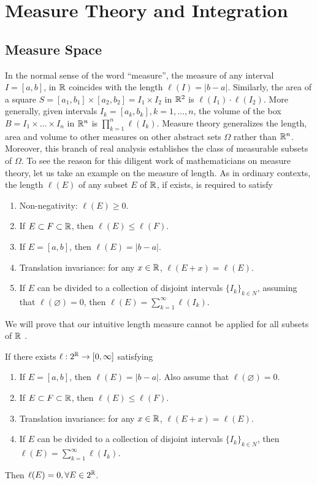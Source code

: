 \section{Measure Theory and Integration}
\subsection{Measure Space}
In the normal sense of the word ``measure'', the measure of any interval $I=[a,b]$, in $\mathbb{R}$ coincides with the length $\ell(I)=|b-a|$. Similarly, the area of a square $S = [a_1,b_1]\times [a_2,b_2] = I_1\times I_2$ in $\mathbb{R}^2$ is $\ell(I_1)\cdot\ell(I_2)$. More generally, given intervals $I_k = [a_k,b_k], k = 1,\ldots, n$, the volume of the box $B= I_1\times \ldots \times I_n$ in  $\mathbb{R}^n$ is $\prod\limits_{k=1}^n \ell(I_k)$. Measure theory generalizes the length, area and volume to other measures on other abstract sets $\Omega$ rather than $\mathbb{R}^n$. Moreover, this branch of real analysis establishes the class of measurable subsets of $\Omega$. To see the reason for this diligent work of mathematicians on measure theory, let us take an example on the measure of length. As in ordinary contexts, the length $\ell(E)$ of any subset $E$ of $\mathbb{R}$, if exists, is required to satisfy

\begin{enumerate}
 \item Non-negativity: $\ell(E) \ge 0$.
 \item If $E\subset F\subset \mathbb{R}$, then $\ell(E)\le \ell(F)$.
 \item If $E=[a,b]$, then $\ell(E) = |b-a|$.
 \item Translation invariance: for any $x\in\mathbb{R}$, $\ell(E+x) = \ell(E)$.
 \item If $E$ can be divided to a collection of disjoint intervals $\{I_k\}_{k\in N}$, assuming that $\ell(\varnothing) = 0$, then $\ell(E) = \sum\limits_{k=1}^\infty \ell(I_k).$
\end{enumerate}

We will prove that our intuitive length measure cannot be applied for all subsets of $\mathbb{R}$ \cite{vitali1905sul}.

\begin{proposition}
 If there exists $\ell : 2^{\mathbb{R}} \to [0,\infty]$ satisfying
 \begin{enumerate}[label=(\arabic*)]
  \item If $E=[a,b]$, then $\ell(E) = |b-a|$. Also assume that $\ell(\varnothing) = 0$.
  \item If $E\subset F\subset \mathbb{R}$, then $\ell(E)\le \ell(F)$.
  \item Translation invariance: for any $x\in\mathbb{R}$, $\ell(E+x) = \ell(E)$.
  \item If $E$ can be divided to a collection of disjoint intervals $\{I_k\}_{k\in N}$, then $\ell(E) = \sum\limits_{k=1}^\infty \ell(I_k).$
 \end{enumerate}
 Then $\ell(E) = 0, \forall E\in 2^{\mathbb{R}}$.
\end{proposition}

